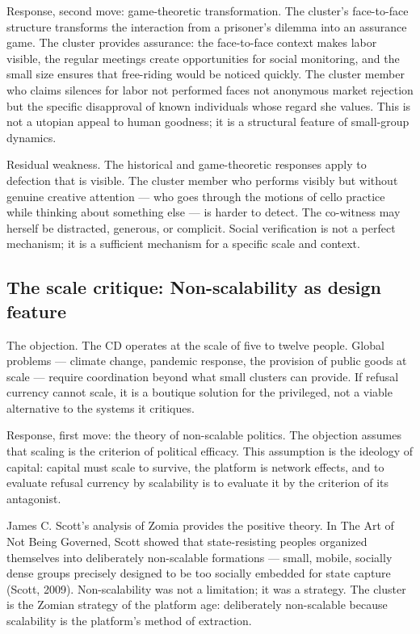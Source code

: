Response, second move: game-theoretic transformation. The cluster's face-to-face structure transforms the interaction from a prisoner's dilemma into an assurance game. The cluster provides assurance: the face-to-face context makes labor visible, the regular meetings create opportunities for social monitoring, and the small size ensures that free-riding would be noticed quickly. The cluster member who claims silences for labor not performed faces not anonymous market rejection but the specific disapproval of known individuals whose regard she values. This is not a utopian appeal to human goodness; it is a structural feature of small-group dynamics.

Residual weakness. The historical and game-theoretic responses apply to defection that is visible. The cluster member who performs visibly but without genuine creative attention — who goes through the motions of cello practice while thinking about something else — is harder to detect. The co-witness may herself be distracted, generous, or complicit. Social verification is not a perfect mechanism; it is a sufficient mechanism for a specific scale and context.

\subsection{The scale critique: Non-scalability as design feature}

The objection. The CD operates at the scale of five to twelve people. Global problems — climate change, pandemic response, the provision of public goods at scale — require coordination beyond what small clusters can provide. If refusal currency cannot scale, it is a boutique solution for the privileged, not a viable alternative to the systems it critiques.

Response, first move: the theory of non-scalable politics. The objection assumes that scaling is the criterion of political efficacy. This assumption is the ideology of capital: capital must scale to survive, the platform is network effects, and to evaluate refusal currency by scalability is to evaluate it by the criterion of its antagonist.

James C. Scott's analysis of Zomia provides the positive theory. In The Art of Not Being Governed, Scott showed that state-resisting peoples organized themselves into deliberately non-scalable formations — small, mobile, socially dense groups precisely designed to be too socially embedded for state capture (Scott, 2009). Non-scalability was not a limitation; it was a strategy. The cluster is the Zomian strategy of the platform age: deliberately non-scalable because scalability is the platform's method of extraction.


